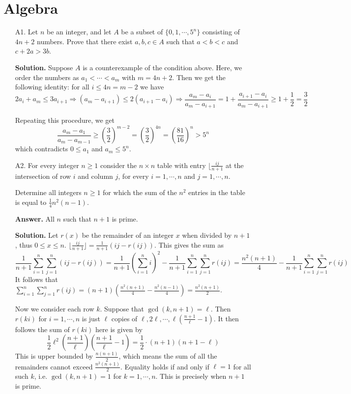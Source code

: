 \documentclass[11pt,a4paper]{article}
\begin{document}
	\section*{Algebra}
	\begin{enumerate}
		\item [A1.] 
		Let $n$ be an integer, and let $A$ be a subset of $\{0, 1, \cdots, 5^n\}$ consisting of $4n + 2$ numbers. Prove that there exist $a,b,c\in A$ such that $a < b < c$ and $c + 2a > 3b$.
		
		\textbf{Solution.} 
		Suppose $A$ is a counterexample of the condition above. 
		Here, we order the numbers as $a_1 < \cdots < a_m$ with $m=4n+2$. 
		Then we get the following identity: 
		for all $i\le 4n = m - 2$ we have 
		\[
		2a_i + a_m \le 3a_{i + 1} \Rightarrow (a_m - a_{i + 1}) \le 2(a_{i + 1} - a_i)
		\Rightarrow 
		\frac{a_m - a_{i}}{a_m - a_{i + 1}}
		= 1 + \frac{a_{i + 1} - a_{i}}{a_m - a_{i + 1}}
		\ge 1 + \frac 12
		=\frac 32
		\]
		
		Repeating this procedure, we get 
		\[
		\frac{a_m - a_1}{a_m - a_{m - 1}} \ge \left(\frac 32\right)^{m - 2}
		=\left(\frac 32\right)^{4n}
		=\left(\frac {81}{16}\right)^{n}
		> 5^n
		\]
		which contradicts $0\le a_1$ and $a_m\le 5^n$. 
		
		\item [A2.] 
		For every integer $n\ge 1$ consider the $n\times n$ table with entry $\lfloor \frac {ij}{n + 1}$ at the intersection of row $i$ and column $j$, for every $i=1, \cdots, n$ and $j=1, \cdots, n$. 
		
		Determine all integers $n\ge 1$ for which the sum of the $n^2$ entries in the table is equal to $\frac 14 n^2(n-1)$. 
		
		\textbf{Answer.} All $n$ such that $n + 1$ is prime. 
		
		\textbf{Solution.} Let $r(x)$ be the remainder of an integer $x$ when divided by $n + 1$, 
		thus $0\le x\le n$. 
		$\lfloor \frac{ij}{n + 1}\rfloor = \frac {1}{n + 1} (ij - r(ij))$. 
		This gives the sum as 
		\[
		\frac{1}{n + 1}\sum_{i=1}^n\sum_{j=1}^n (ij - r(ij))
		=\frac{1}{n + 1}(\sum_{i=1}^n i)^2 - \frac{1}{n + 1} \sum_{i=1}^n\sum_{j=1}^n r(ij)
		=\frac{n^2(n+1)}{4} - \frac{1}{n + 1} \sum_{i=1}^n\sum_{j=1}^n r(ij)
		\]
		It follows that $\sum_{i=1}^n\sum_{j=1}^n r(ij) = 
		(n + 1)(\frac{n^2(n+1)}{4} - \frac{n^2(n-1)}{4})=\frac{n^2(n+1)}{2}$. 
		
		Now we consider each row $k$. Suppose that $\gcd(k, n + 1) = \ell$. 
		Then $r(ki)$ for $i=1, \cdots, n$ is just $\ell$ copies of 
		$\ell, 2\ell, \cdots, \ell(\frac{n + 1}{\ell} - 1)$. 
		It then follows the sum of $r(ki)$ here is given by 
		\[
		\frac 12 \ell^2 (\frac{n + 1}{\ell})(\frac{n + 1}{\ell} - 1)
		=\frac 12 \cdot (n + 1)(n + 1 - \ell)
		\]
		This is upper bounded by $\frac {n(n+1)}{2}$, which means the sum of all the remainders cannot exceed $\frac{n^2(n+1)}{2}$. 
		Equality holds if and only if $\ell=1$ for all such $k$, 
		i.e. $\gcd(k, n + 1)=1$ for $k=1, \cdots, n$. 
		This is precisely when $n + 1$ is prime. 
		

\end{enumerate}
\end{document}
